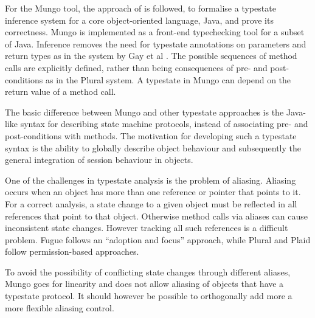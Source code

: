 
For the Mungo tool\cite{mungo}, the approach of \cite{gay.vasconcelos.etal_modular-session-types} is followed, to formalise a typestate inference system for a core object-oriented language, Java, and prove its correctness. Mungo is implemented as a front-end typechecking tool for a subset of Java. Inference removes the need for typestate annotations on parameters and return types as in the system by Gay et al \cite{gay.vasconcelos.etal_modular-session-types}. The possible sequences of method calls are explicitly defined, rather than being consequences of pre- and post-conditions as in the Plural system. A typestate in Mungo can depend on the return value of a method call.

The basic difference between Mungo and other typestate approaches is the Java-like syntax for describing state machine protocols, instead of associating pre- and post-conditions with methods. The motivation for developing such a typestate syntax is the ability to globally describe object behaviour and subsequently the general integration of session behaviour in objects.


One of the challenges in typestate analysis is the problem of aliasing. Aliasing occurs when an object has more than one reference or pointer that points to it. For a correct analysis, a state change to a given object must be reflected in all references that point to that object. Otherwise method calls via aliases can cause inconsistent state changes. However tracking all such references is a difficult problem. Fugue follows an ``adoption and focus'' approach, while Plural and Plaid follow permission-based approaches.

To avoid the possibility of conflicting state changes through different aliases, Mungo goes for linearity and does not allow aliasing of objects that have a typestate protocol. It should however be possible to orthogonally add more a more flexible aliasing control. 

